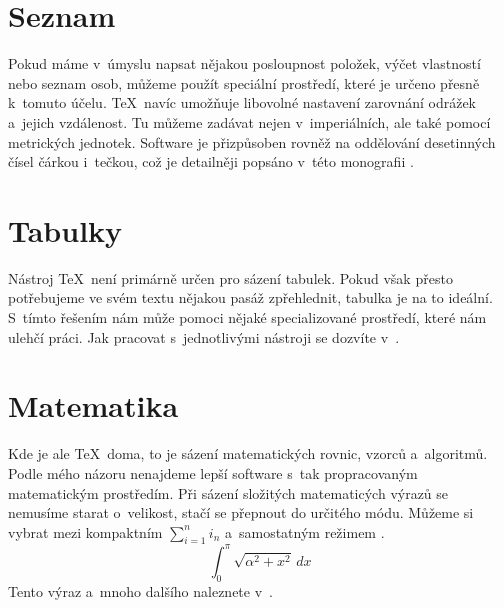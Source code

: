 \documentclass[a4paper, 11pt]{article}
\begin{document}
\section{Seznam}
Pokud máme v~úmyslu napsat nějakou posloupnost položek, výčet vlastností nebo seznam osob, můžeme použít speciální prostředí, které je určeno přesně k~tomuto účelu.
\TeX\ navíc umožňuje libovolné nastavení zarovnání odrážek a~jejich vzdálenost.
Tu můžeme zadávat nejen v~imperiálních, ale také pomocí metrických jednotek.
Software je přizpůsoben rovněž na oddělování desetinných čísel čárkou i~tečkou, což je detailněji popsáno v~této monografii \cite{Olsak2016}.

\section{Tabulky}
Nástroj \TeX\ není primárně určen pro sázení tabulek.
Pokud však přesto potřebujeme ve svém textu nějakou pasáž zpřehlednit, tabulka je na to ideální.
S~tímto řešením nám může pomoci nějaké specializované prostředí, které nám ulehčí práci.
Jak pracovat s~jednotlivými nástroji se dozvíte v~\cite{Voss2011}.

\section{Matematika}
Kde je ale \TeX\ doma, to je sázení matematických rovnic, vzorců a~algoritmů.
Podle mého názoru nenajdeme lepší software s~tak propracovaným matematickým prostředím.
Při sázení složitých matematicých výrazů se nemusíme starat o~velikost, stačí se přepnout do určitého módu.
Můžeme si vybrat mezi kompaktním $\sum_{i=1}^n i_n$ a~samostatným režimem \cite{Satrapa2011}.
$$\int_{0}^{\pi} \sqrt{\alpha^{2} + x^{2}}\,dx$$
Tento výraz a~mnoho dalšího naleznete v~\cite{Gratzer2004}.

\newpage


\end{document}
